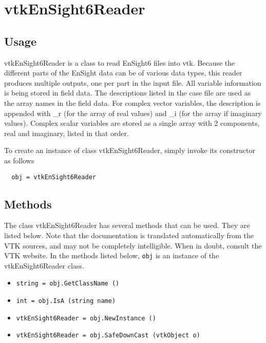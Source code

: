 \section{vtkEnSight6Reader}

\subsection{Usage}

 vtkEnSight6Reader is a class to read EnSight6 files into vtk.
 Because the different parts of the EnSight data can be of various data
 types, this reader produces multiple outputs, one per part in the input
 file.
 All variable information is being stored in field data.  The descriptions
 listed in the case file are used as the array names in the field data.
 For complex vector variables, the description is appended with \_r (for the
 array of real values) and \_i (for the array if imaginary values).  Complex
 scalar variables are stored as a single array with 2 components, real and
 imaginary, listed in that order.

To create an instance of class vtkEnSight6Reader, simply
invoke its constructor as follows
\begin{verbatim}
  obj = vtkEnSight6Reader
\end{verbatim}
\subsection{Methods}

The class vtkEnSight6Reader has several methods that can be used.
  They are listed below.
Note that the documentation is translated automatically from the VTK sources,
and may not be completely intelligible.  When in doubt, consult the VTK website.
In the methods listed below, \verb|obj| is an instance of the vtkEnSight6Reader class.
\begin{itemize}
\item  \verb|string = obj.GetClassName ()|

\item  \verb|int = obj.IsA (string name)|

\item  \verb|vtkEnSight6Reader = obj.NewInstance ()|

\item  \verb|vtkEnSight6Reader = obj.SafeDownCast (vtkObject o)|

\end{itemize}
